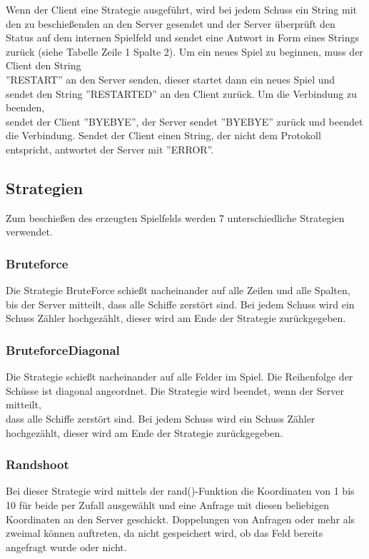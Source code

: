 Wenn der Client eine Strategie ausgeführt, wird bei jedem Schuss ein String mit den zu beschießenden an den Server gesendet und der Server überprüft den Status auf dem internen Spielfeld und sendet eine Antwort in Form eines Strings zurück (siehe Tabelle Zeile 1 Spalte 2).
Um ein neues Spiel zu beginnen, muss der Client den String \\''RESTART'' an den Server senden, dieser startet dann ein neues Spiel und sendet den String ''RESTARTED'' an den Client zurück. Um die Verbindung zu beenden, \\sendet der Client ''BYEBYE'', der Server sendet ''BYEBYE'' zurück und beendet die Verbindung.
Sendet der Client einen String, der nicht dem Protokoll entspricht, antwortet der Server mit ''ERROR''. 

\subsection{Strategien}
Zum beschießen des erzeugten Spielfelds werden 7 unterschiedliche Strategien verwendet.

\subsubsection{Bruteforce}

Die Strategie BruteForce schießt nacheinander auf alle Zeilen und alle Spalten, \\bis der Server mitteilt, dass alle Schiffe zerstört sind. Bei jedem Schuss wird ein Schuss Zähler hochgezählt, dieser wird am Ende der Strategie zurückgegeben.

\subsubsection{BruteforceDiagonal}

Die Strategie schießt nacheinander auf alle Felder im Spiel. Die Reihenfolge der Schüsse ist diagonal angeordnet. Die Strategie wird beendet, wenn der Server mitteilt, \\dass alle Schiffe zerstört sind. Bei jedem Schuss wird ein Schuss Zähler hochgezählt, dieser wird am Ende der Strategie zurückgegeben.
\newpage

\subsubsection{Randshoot}

Bei dieser Strategie wird mittels der rand()-Funktion die Koordinaten von 1 bis 10 für
beide per Zufall ausgewählt und eine Anfrage mit diesen beliebigen Koordinaten an den
Server geschickt. Doppelungen von Anfragen oder mehr als zweimal können auftreten,
da nicht gespeichert wird, ob das Feld bereits angefragt wurde oder nicht.

